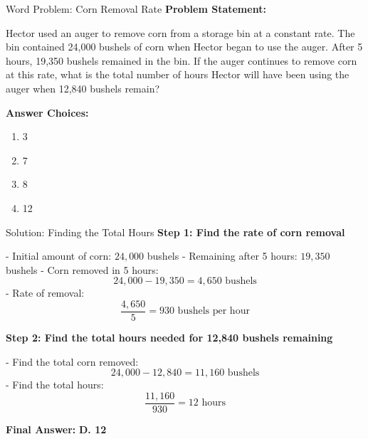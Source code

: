 \documentclass{beamer}
\begin{document}
\begin{frame}{Word Problem: Corn Removal Rate}
    \textbf{Problem Statement:}
    
    Hector used an auger to remove corn from a storage bin at a constant rate. The bin contained 24,000 bushels of corn when Hector began to use the auger. After 5 hours, 19,350 bushels remained in the bin. If the auger continues to remove corn at this rate, what is the total number of hours Hector will have been using the auger when 12,840 bushels remain?
    
    \vspace{0.5cm}
    
    \textbf{Answer Choices:}
    
    \begin{enumerate}
        \item[A] 3
        \item[B] 7
        \item[C] 8
        \item[D] 12
    \end{enumerate}
\end{frame}

\begin{frame}{Solution: Finding the Total Hours}
    \textbf{Step 1: Find the rate of corn removal}
    
    - Initial amount of corn: \( 24,000 \) bushels  
    - Remaining after 5 hours: \( 19,350 \) bushels  
    - Corn removed in 5 hours:
      \[
      24,000 - 19,350 = 4,650 \text{ bushels}
      \]
    - Rate of removal:
      \[
      \frac{4,650}{5} = 930 \text{ bushels per hour}
      \]

    \vspace{0.3cm}

    \textbf{Step 2: Find the total hours needed for 12,840 bushels remaining}
    
    - Find the total corn removed:
      \[
      24,000 - 12,840 = 11,160 \text{ bushels}
      \]
    - Find the total hours:
      \[
      \frac{11,160}{930} = 12 \text{ hours}
      \]

    \vspace{0.3cm}
    \textbf{Final Answer:} \textcolor{novelPurple}{\textbf{D. 12}}
\end{frame}
\end{document}
